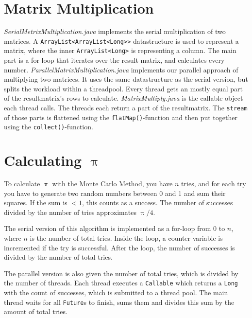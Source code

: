 \documentclass{article}
\begin{document}
  \section{Matrix Multiplication}
  
  \textit{SerialMetrixMultiplication.java} implements the serial multiplication of two matrices. A \texttt{ArrayList<ArrayList<Long>>} datastructure is used to represent a matrix, where the inner \texttt{ArrayList<Long>} is representing a column. The main part is a for loop that iterates over the result matrix, and calculates every number.\bigbreak
  \textit{ParallelMatrixMultiplication.java} implements our parallel approach of multiplying two matrices. It uses the same datastructure as the serial version, but splits the workload within a threadpool. Every thread gets an mostly equal part of the resultmatrix's rows to calculate. \textit{MatrixMultiply.java} is the callable object each thread calls. The threads each return a part of the resultmatrix. The \texttt{stream} of those parts is flattened using the \texttt{flatMap()}-function and then put together using the \texttt{collect()}-function.

  \section{Calculating $\uppi$}

  To calculate $\uppi$ with the Monte Carlo Method, you have $n$ tries, and for each try you have to generate two random numbers between 0 and 1 and sum their squares. If the sum is $< 1$, this counts as a success. The number of successes divided by the number of tries approximates $\uppi / 4$.

  The serial version of this algorithm is implemented as a for-loop from $0$ to $n$, where $n$ is the number of total tries. Inside the loop, a counter variable is incremented if the try is successful. After the loop, the number of successes is divided by the number of total tries.

  The parallel version is also given the number of total tries, which is divided by the number of threads. Each thread executes a \texttt{Callable} which returns a \texttt{Long} with the count of successes, which is submitted to a thread pool. The main thread waits for all \texttt{Future}s to finish, sums them and divides this sum by the amount of total tries.
\end{document}
